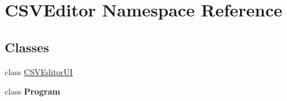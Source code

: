 \hypertarget{namespace_c_s_v_editor}{}\section{C\+S\+V\+Editor Namespace Reference}
\label{namespace_c_s_v_editor}
\subsection*{Classes}
\begin{DoxyCompactItemize}
\item 
class \mbox{\hyperlink{class_c_s_v_editor_1_1_c_s_v_editor_u_i}{C\+S\+V\+Editor\+UI}}
\item 
class {\bfseries Program}
\end{DoxyCompactItemize}
